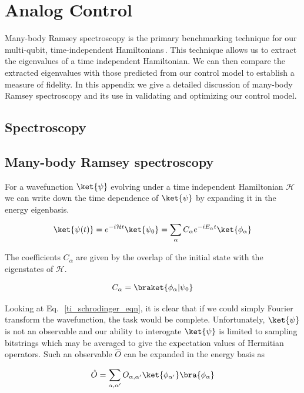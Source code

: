 \chapter[Analog Control]{Analog Control}
Many-body Ramsey spectroscopy is the primary benchmarking technique for our multi-qubit, time-independent Hamiltonians\,\cite{Roushan2018}.
This technique allows us to extract the eigenvalues of a time independent Hamiltonian.
We can then compare the extracted eigenvalues with those predicted from our control model to establish a measure of fidelity.
In this appendix we give a detailed discussion of many-body Ramsey spectroscopy and its use in validating and optimizing our control model.
\section{Spectroscopy}

\section{Many-body Ramsey spectroscopy}

For a wavefunction $\ket{\psi}$ evolving under a time independent Hamiltonian $\mathcal{H}$ we can write down the time dependence of $\ket{\psi}$ by expanding it in the
energy eigenbasis.

\begin{equation}
    \label{ti_schrodinger_eqn}
    \ket{\psi (t)} =e^{-i \mathcal{H} t} \ket{\psi_{0}} = \sum_{\alpha} C_{\alpha} e^{-i E_{\alpha} t} \ket{\phi_{\alpha}}
\end{equation}

\noindent The coefficients $C_{\alpha}$ are given by the overlap of the initial state with the eigenstates of $\mathcal{H}$.

\begin{equation}
    C_{\alpha} = \braket{\phi_{\alpha}|\psi_{0}}
\end{equation}

\noindent Looking at Eq.\,~\ref{ti_schrodinger_eqn}, it is clear that if we could simply Fourier transform the wavefunction, the task would be complete.
Unfortunately, $\ket{\psi}$ is not an observable and our ability to interogate $\ket{\psi}$ is limited to sampling bitstrings which may be averaged
to give the expectation values of Hermitian operators.  Such an observable $\hat{O}$ can be expanded in the energy basis as

\begin{equation}
    \label{observable}
    \hat{O} = \sum_{\alpha,\alpha^{\prime}} O_{\alpha,\alpha^{\prime}} \ket{\phi_{\alpha^{\prime}}} \bra{\phi_{\alpha}}
\end{equation}

